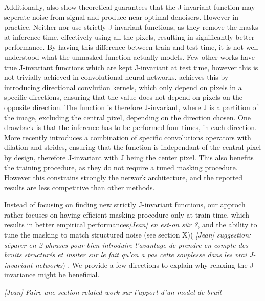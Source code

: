 \documentclass{article}
\begin{document}
Additionally, \cite{batson2019noise2self} also show theoretical guarantees that the J-invariant function may seperate noise from signal and produce near-optimal denoisers.
However in practice, Neither \cite{krull2018noise2void} nor \cite{batson2019noise2self} use strictly J-invariant functions, as they remove the masks at inference time,
effectively using all the pixels, resulting in significantly better performance. By having this difference between train and test time, it is not well understood what the unmasked function actually models.
Few other works have true J-invariant functions which are kept J-invariant at test time, however this is not trivially achieved in convolutional neural networks. \cite{laine2019high} achieves this by introducing directional convlution kernels, which only depend on pixels in a specific directions, ensuring that the value does not depend on pixels on the opposite direction. The function is therefore J-invariant, where J is a partition of the image, excluding the central pixel, depending on the direction chosen. One drawback is that the inference has to be performed four times, in each direction. More recently \cite{lee2020noise2kernel} introduces a combination of specific convolutions operators with dilation and strides, ensuring that the function is independant of the central pixel by design, therefore J-invariant with J being the center pixel. This also benefits the training procedure, as they do not require a tuned masking procedure. However this constrains strongly the network architecture, and the reported results are less competitive than other methods.

Instead of focusing on finding new strictly J-invariant functions, our approch rather focuses on having efficient masking procedure only at train time, which results in better empirical performances\textit{[Jean] en est-on sûr ?}, and the ability to tune the masking to match structured noise (see section X)(\cite{broaddus2020removing} \textit{[Jean] suggestion: séparer en 2 phrases pour bien introduire l'avantage de prendre en compte des bruits structurés et insiter sur le fait qu'on a pas cette souplesse dans les vrai J-invariant networks}) . We provide a few directions to explain why relaxing the J-invariance might be beneficial.

\textit{[Jean] Faire une section related work sur l'apport d'un model de bruit}
\end{document}
